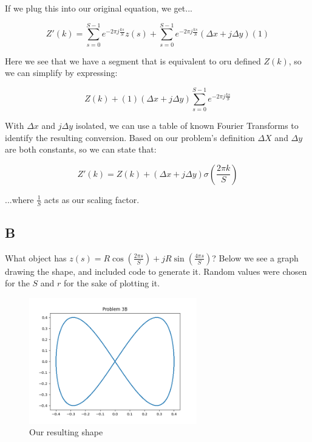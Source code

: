 \documentclass{article}
\begin{document}
\noindent If we plug this into our original equation, we get...

\begin{equation}
    Z'(k) = \sum_{s=0}^{S-1} e^{-2\pi j \frac{ks}{S}}z(s) + \sum_{s=0}^{S-1} e^{-2\pi j \frac{ks}{S}} (\Delta x + j \Delta y) (1)
\end{equation}

\noindent Here we see that we have a segment that is equivalent to oru defined $Z(k)$, so we can simplify by expressing:

\begin{equation}
    Z(k) + (1) (\Delta x + j \Delta y) \sum_{s=0}^{S-1} e^{-2\pi j \frac{ks}{S}}
\end{equation}

\noindent With $\Delta x$ and $j \Delta y$ isolated, we can use a table of known Fourier Transforms to identify the resulting conversion. Based on our problem's definition $\Delta X$ and $\Delta y$ are both constants, so we can state that:

\begin{equation}
    Z'(k) = Z(k) + (\Delta x + j \Delta y) \sigma(\frac{2 \pi k}{S})
\end{equation}

\noindent ...where $\frac{1}{S}$ acts as our scaling factor.

\subsection*{B}

What object has $z(s) = R \cos(\frac{2\pi s}{S}) + jR \sin(\frac{4\pi s}{S})$? Below we see a graph drawing the shape, and included code to generate it. Random values were chosen for the $S$ and $r$ for the sake of plotting it.

\begin{figure}[H]
    \centering
    \includegraphics[width = 0.65\textwidth]{imgs/prob3_b.png}
    \caption{Our resulting shape}
    \label{fig:prob3-b}
\end{figure}
\end{document}
